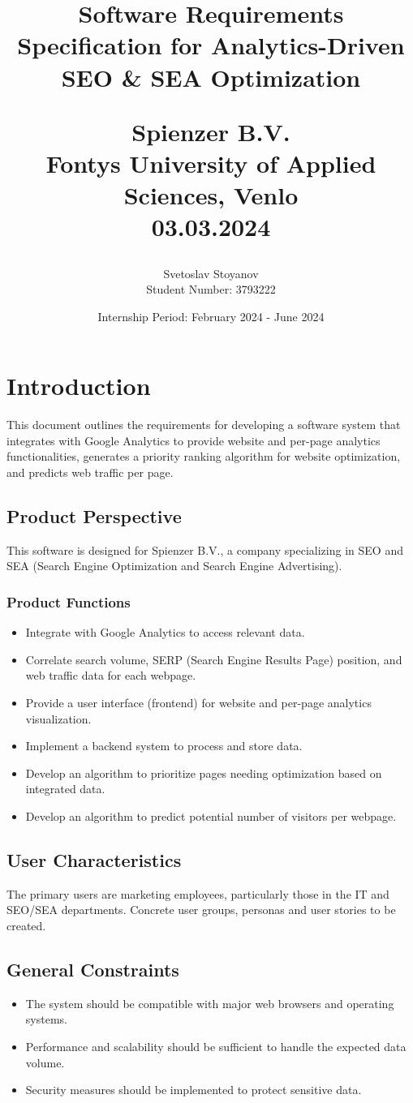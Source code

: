 \documentclass[12pt]{article}
\title{
    Software Requirements Specification for Analytics-Driven SEO \& SEA Optimization\\[1ex] %
    \author{Svetoslav Stoyanov\\Student Number: 3793222}
    \date{Internship Period: February 2024 - June 2024}
    \large Spienzer B.V.\\ %
    \large Fontys University of Applied Sciences, Venlo\\03.03.2024 %
}
\begin{document}
\maketitle
\newpage %

\section{Introduction}
This document outlines the requirements for developing a software system that integrates with Google Analytics to provide website and per-page analytics functionalities, generates a priority ranking algorithm for website optimization, and predicts web traffic per page.

\subsection{Product Perspective}
This software is designed for Spienzer B.V., a company specializing in SEO and SEA (Search Engine Optimization and Search Engine Advertising).

\subsubsection{Product Functions}
\begin{itemize}
    \item Integrate with Google Analytics to access relevant data.
    \item Correlate search volume, SERP (Search Engine Results Page) position, and web traffic data for each webpage.
    \item Provide a user interface (frontend) for website and per-page analytics visualization.
    \item Implement a backend system to process and store data.
    \item Develop an algorithm to prioritize pages needing optimization based on integrated data.
    \item Develop an algorithm to predict potential number of visitors per webpage.
\end{itemize}

\subsection{User Characteristics}
The primary users are marketing employees, particularly those in the IT and SEO/SEA departments.
Concrete user groups, personas and user stories to be created.
\subsection{General Constraints}
\begin{itemize}
    \item The system should be compatible with major web browsers and operating systems.
    \item Performance and scalability should be sufficient to handle the expected data volume.
    \item Security measures should be implemented to protect sensitive data.
\end{itemize}
\end{document}
